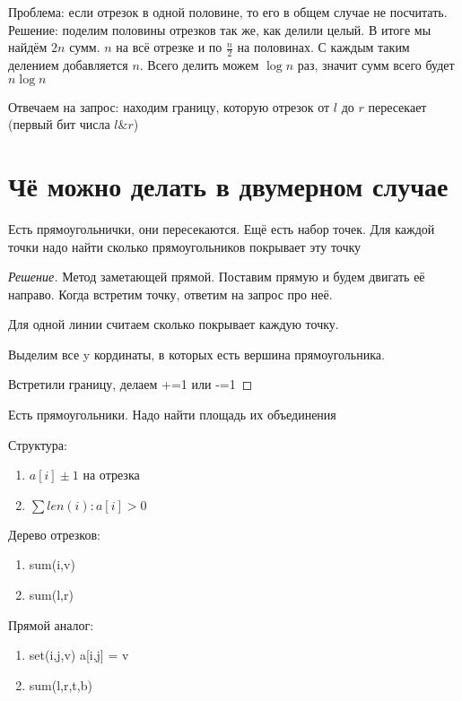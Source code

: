\documentclass{book}
\theoremstyle{definition}
\begin{document}
Проблема: если отрезок в одной половине, то его в общем случае не посчитать. Решение: поделим половины отрезков так же, как делили целый. В итоге мы найдём $2n$ сумм.  $n$ на всё отрезке и по  $\frac{n}{2}$ на половинах. С каждым таким делением добавляется $n$. Всего делить можем  $\log n$ раз, значит сумм всего будет $n\log n$

Отвечаем на запрос: находим границу, которую отрезок от  $l$ до $r$ пересекает (первый бит числа  $l\& r$)

\section{Чё можно делать в двумерном случае}

\begin{problem}
    Есть прямоугольнички, они пересекаются. Ещё есть набор точек. Для каждой точки надо найти сколько прямоугольников покрывает эту точку
\end{problem}
\begin{proof}
    [Решение]

    Метод заметающей прямой. Поставим прямую и будем двигать её направо. Когда встретим точку, ответим на запрос про неё.

    Для одной линии считаем сколько покрывает каждую точку.

    Выделим все y кординаты, в которых есть вершина прямоугольника. 

    Встретили границу, делаем +=1 или -=1


\end{proof}

\begin{problem}
    Есть прямоугольники. Надо найти площадь их объединения

    Структура:
    \begin{enumerate}
        \item $a[i]\pm 1$ на отрезка
        \item $\sum len(i):a[i]>0$
    \end{enumerate}
\end{problem}


Дерево отрезков:
\begin{enumerate}
    \item sum(i,v)
    \item sum(l,r)
\end{enumerate}

Прямой аналог:
\begin{enumerate}
    \item set(i,j,v) \quad a[i,j] = v
    \item sum(l,r,t,b)
\end{enumerate}
\end{document}
